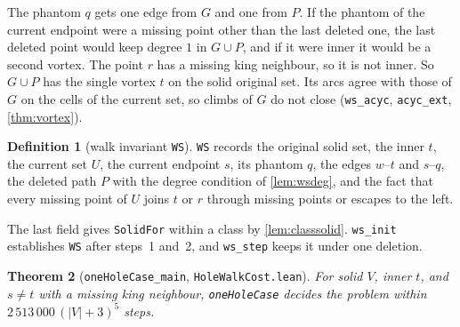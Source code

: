 \documentclass[11pt]{article}
\theoremstyle{plain}
\newtheorem{theorem}{Theorem}[section]
\theoremstyle{definition}
\newtheorem{definition}[theorem]{Definition}
\theoremstyle{remark}
\newcommand{\lean}[1]{\texttt{#1}}
\begin{document}
The phantom $q$ gets one edge from $G$ and one from $P$.
If the phantom of the current endpoint were a missing point other than the last deleted one, the
last deleted point would keep degree $1$ in $G\cup P$, and if it were inner it would be a second
vortex.
The point $r$ has a missing king neighbour, so it is not inner.
So $G\cup P$ has the single vortex $t$ on the solid original set.
Its arcs agree with those of $G$ on the cells of the current set, so climbs of $G$ do not close
(\lean{ws\_acyc}, \lean{acyc\_ext}, \cref{thm:vortex}).

\begin{definition}[walk invariant \lean{WS}]
\lean{WS} records the original solid set, the inner $t$, the current set $U$, the current endpoint $s$, its
phantom $q$, the edges $w$--$t$ and $s$--$q$, the deleted path $P$ with the degree condition of
\cref{lem:wsdeg}, and the fact that every missing point of $U$ joins $t$ or $r$ through missing
points or escapes to the left.
\end{definition}

The last field gives \lean{SolidFor} within a class by \cref{lem:classsolid}.
\lean{ws\_init} establishes \lean{WS} after steps~1 and~2, and \lean{ws\_step} keeps it under one
deletion.

\begin{theorem}[\lean{oneHoleCase\_main}, \lean{HoleWalkCost.lean}]
\label{thm:one}
For solid $V$, inner $t$, and $s\ne t$ with a missing king neighbour, \lean{oneHoleCase} decides the
problem within $2\,513\,000\,(|V|+3)^5$ steps.
\end{theorem}
\end{document}
